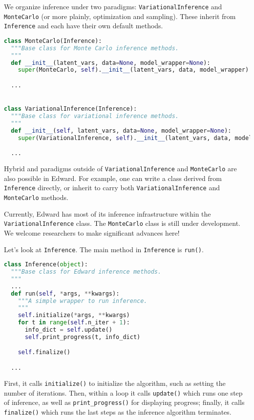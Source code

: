 We organize inference under two paradigms:
\texttt{VariationalInference} and \texttt{MonteCarlo} (or more plainly,
optimization and sampling). These inherit from \texttt{Inference} and each
have their own default methods.

\begin{lstlisting}[language=Python]
class MonteCarlo(Inference):
  """Base class for Monte Carlo inference methods.
  """
  def __init__(latent_vars, data=None, model_wrapper=None):
    super(MonteCarlo, self).__init__(latent_vars, data, model_wrapper)

  ...


class VariationalInference(Inference):
  """Base class for variational inference methods.
  """
  def __init__(self, latent_vars, data=None, model_wrapper=None):
    super(VariationalInference, self).__init__(latent_vars, data, model_wrapper)

  ...
\end{lstlisting}

Hybrid and paradigms outside of \texttt{VariationalInference}
and \texttt{MonteCarlo} are also possible in Edward. For example, one can
write a class derived from \texttt{Inference} directly, or inherit to
carry both \texttt{VariationalInference} and \texttt{MonteCarlo} methods.

Currently, Edward has most of its inference infrastructure within the
\texttt{VariationalInference} class.
The \texttt{MonteCarlo} class is still under development. We welcome
researchers to make significant advances here!

Let's look at \texttt{Inference}. The main method in
\texttt{Inference} is \texttt{run()}.

\begin{lstlisting}[language=Python]
class Inference(object):
  """Base class for Edward inference methods.
  """
  ...
  def run(self, *args, **kwargs):
    """A simple wrapper to run inference.
    """
    self.initialize(*args, **kwargs)
    for t in range(self.n_iter + 1):
      info_dict = self.update()
      self.print_progress(t, info_dict)

    self.finalize()

  ...
\end{lstlisting}

First, it calls \texttt{initialize()} to initialize the algorithm, such as
setting the number of iterations. Then, within a loop it calls
\texttt{update()} which runs one step of inference, as well as
\texttt{print_progress()} for displaying progress; finally, it
calls \texttt{finalize()} which runs the last steps as the inference
algorithm terminates.

